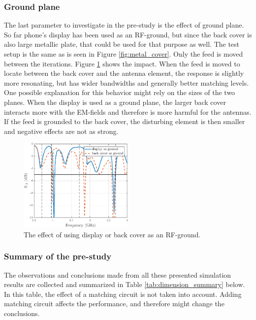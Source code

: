 \subsubsection{Ground plane}
\label{sec:ground_plane}
The last parameter to investigate in the pre-study is the effect of ground plane. So far phone's display has been used as an RF-ground, but since the back cover is also large metallic plate, that could be used for that purpose as well. The test setup is the same as is seen in Figure \ref{fig:metal_cover}. Only the feed is moved between the iterations. Figure \ref{fig:ground_plane} shows the impact. When the feed is moved to locate between the back cover and the antenna element, the response is slightly more resonating, but has wider bandwidths and generally better matching levels. One possible explanation for this behavior might rely on the sizes of the two planes. When the display is used as a ground plane, the larger back cover interacts more with the EM-fields and therefore is more harmful for the antennas. If the feed is grounded to the back cover, the disturbing element is then smaller and negative effects are not as strong.

\begin{figure}[H]
    \centering
    \includegraphics[width=0.5\textwidth]{img/ground_vs_display.eps}
    \vspace{-7pt}
    \caption{The effect of using display or back cover as an RF-ground.}
    \label{fig:ground_plane}
\end{figure}

\subsubsection{Summary of the pre-study}
\label{sec:pre_study_summary}
The observations and conclusions made from all these presented simulation results are collected and summarized in Table \ref{tab:dimension_summary} below. In this table, the effect of a matching circuit is not taken into account. Adding matching circuit affects the performance, and therefore might change the conclusions.

